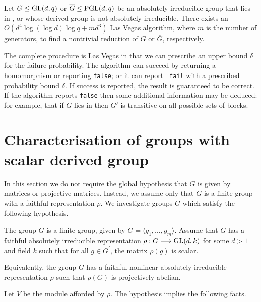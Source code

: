 \begin{Theo} 
Let $G \leq \GL(d, q)$ or $\overline{G} \leq \PGL(d, q)$ be an absolutely 
irreducible group that lies in ,  or 
whose derived group is not absolutely irreducible. 
There exists an $O(d^4 \log (\log d) \log q + md^3)$ Las Vegas 
algorithm, where $m$ is the number of generators,  to find a nontrivial reduction of $G$ or $\overline{G}$, respectively.
\end{Theo}

The complete procedure is Las Vegas in that we can prescribe an upper
bound $\delta$ for the failure probability. The algorithm can succeed by
returning a homomorphism or reporting {\tt false}; or it can report {\tt
fail} with a prescribed probability bound
 $\delta$. If success is reported, the result is
guaranteed to be correct. If the algorithm reports {\tt false} then some
additional information may be deduced: for example, that if $G$ lies in
 then $G'$ is transitive on all possible sets of blocks.



\section{Characterisation of groups with scalar derived group }
\label{sec:describe_scalars}

In this section we do not require the global hypothesis that 
$G$ is given by matrices or projective matrices.
Instead, we assume only that  $G$ is a finite group with a faithful 
representation $\rho$. We investigate groups $G$ which
satisfy the following hypothesis.

\begin{Hyp} \label{group-info}
The group $G$ is a finite group, given by  
$G = \langle g_1, \ldots, g_m\rangle$. 
Assume that $G$ has a faithful absolutely irreducible representation
$\rho: G \longrightarrow \GL(d,k)$ for some $d > 1$ and field $k$ such that 
for all $g \in G^\prime$, the matrix $\rho(g)$ is scalar. 
\end{Hyp} 

Equivalently, the group $G$ has a faithful 
nonlinear absolutely irreducible representation
$\rho$ such that $\rho(G)$ is projectively abelian. 

Let $V$ be the module afforded by  $\rho$.
The hypothesis implies the following facts.

